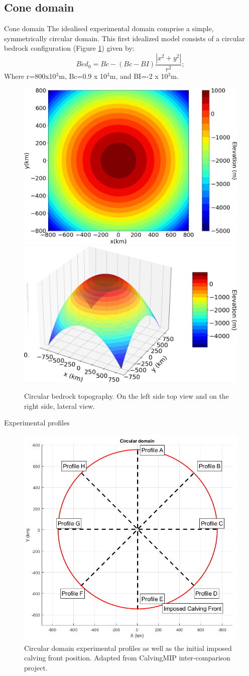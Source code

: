 \documentclass[11pt]{beamer}
\begin{document}
	\subsection{Cone domain}
		\begin{frame}{Cone domain}
		\justifying
		The idealised experimental domain comprise a simple, symmetrically circular domain. This first idealized model consists of a circular bedrock configuration (Figure \ref{circular_topo_top}) given by:
		\begin{equation}
			Bed_0=Bc-(Bc-BI)\frac{|x^2+y^2|}{r^2};
		\end{equation}
		Where r=800x10$^3$m, Bc=0.9 x 10$^3$m, and BI=-2 x 10$^3$m. \pause
		\begin{figure}
			\centering
			\includegraphics[width=0.45\linewidth]{../fig/circular_topo_top.png}
			\includegraphics[width=0.45\linewidth]{../fig/circular_topo_jet}
			\caption{Circular bedrock topography. On the left side top view and on the right side, lateral view.}
			\label{circular_topo_top}
		\end{figure}
		\end{frame}
		\begin{frame}{Experimental profiles}
		\begin{figure}
			\centering
			\includegraphics[width=0.5\linewidth]{../fig/cone.png}
			\caption{Circular domain experimental profiles as well as the initial imposed calving front position. Adapted from CalvingMIP inter-comparison project.}
			\label{cone_profile}
		\end{figure}
		\end{frame}
	
\end{document}
